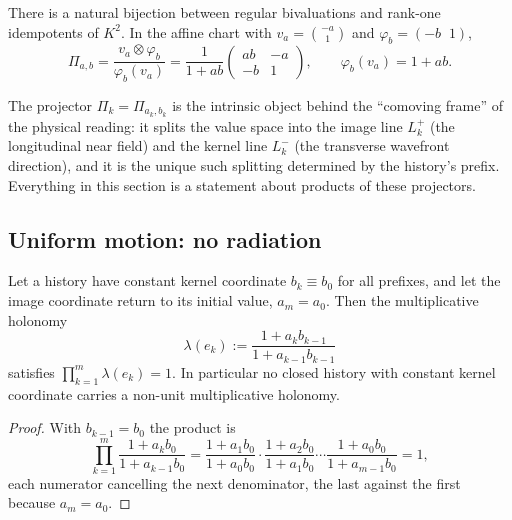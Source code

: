 \begin{theorem}
\label{thm:projector}
There is a natural bijection between regular bivaluations and rank-one
idempotents of $K^{2}$.  In the affine chart with
$v_a=\binom{-a}{1}$ and $\varphi_b=(-b\;\;1)$,
\begin{equation}\label{eq:projector}
  \Pi_{a,b}=\frac{v_a\otimes\varphi_b}{\varphi_b(v_a)}
  =\frac{1}{1+ab}\begin{pmatrix}ab&-a\\-b&1\end{pmatrix},
  \qquad
  \varphi_b(v_a)=1+ab .
\end{equation}
\end{theorem}

The projector $\Pi_k=\Pi_{a_k,b_k}$ is the intrinsic object behind the
``comoving frame'' of the physical reading: it splits the value space into the
image line $L_k^+$ (the longitudinal near field) and the kernel line $L_k^-$ (the
transverse wavefront direction), and it is the unique such splitting determined
by the history's prefix.  Everything in this section is a statement about
products of these projectors.

\subsection{Uniform motion: no radiation}

\begin{theorem}
\label{thm:no-radiation}
Let a history have constant kernel coordinate $b_k\equiv b_0$ for all prefixes,
and let the image coordinate return to its initial value,
$a_m=a_0$.  Then the multiplicative holonomy
\begin{equation}\label{eq:lambda-edge}
  \lambda(e_k):=\frac{1+a_kb_{k-1}}{1+a_{k-1}b_{k-1}}
\end{equation}
satisfies $\prod_{k=1}^{m}\lambda(e_k)=1$.  In particular no closed history with
constant kernel coordinate carries a non-unit multiplicative holonomy.
\end{theorem}

\begin{proof}
With $b_{k-1}=b_0$ the product is
\[
  \prod_{k=1}^{m}\frac{1+a_kb_0}{1+a_{k-1}b_0}
  =\frac{1+a_1b_0}{1+a_0b_0}\cdot\frac{1+a_2b_0}{1+a_1b_0}\cdots
   \frac{1+a_0b_0}{1+a_{m-1}b_0}=1,
\]
each numerator cancelling the next denominator, the last against the first
because $a_m=a_0$.
\end{proof}

